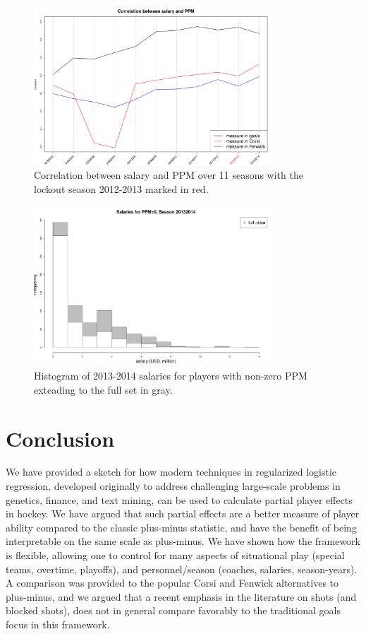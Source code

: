 \begin{figure}[htb!]
    \centering
    \includegraphics[width=0.8\textwidth]{figures/ppmsal-corr-season.pdf}
    \caption{Correlation between salary and PPM over 11 seasons with the lockout season 2012-2013 marked in red.}\label{fig:ppmsal-corr-season}
\end{figure}


\begin{figure}[htb!]
	\centering
	\includegraphics[width=0.8\textwidth]{figures/salaryhist.pdf}
	\caption{Histogram of 2013-2014 salaries for players with non-zero PPM exteading to the full set in gray.}\label{fig:salaryhist}
\end{figure}


\section{Conclusion}\label{sec:conclusion}

We have provided a sketch for how modern techniques in regularized logistic
regression, developed originally to address challenging large-scale problems
in genetics, finance, and text mining, can be used to calculate partial player
effects in hockey.  We have argued that such  partial effects are a
better measure of player ability compared to the classic plus-minus statistic,
and have the benefit of being interpretable on the same scale as plus-minus.
 We have shown
how the framework is flexible, allowing one to control for many aspects of
situational play (special teams, overtime, playoffs), and personnel/season
(coaches, salaries, season-years).  A comparison was provided to the popular
Corsi and Fenwick alternatives to plus-minus, and we argued that a recent
emphasis in the literature on shots (and blocked shots), does not in general
compare favorably to the traditional goals focus in this framework.

